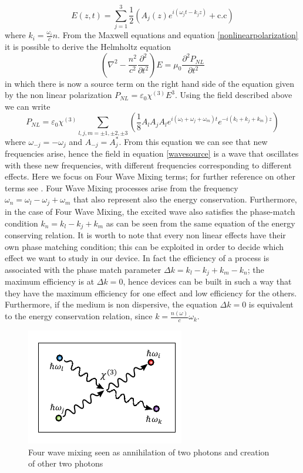\documentclass[12pt]{book}
\begin{document}
\begin{equation}E(z,t) = \sum_{j=1}^{3} \frac{1}{2}(A_j(z)e^{i(\omega_jt -k_jz)}+\text{c.c})\end{equation}
where $k_i = \frac{\omega_i}{c}n$. From the Maxwell equations and equation \eqref{nonlinearpolarization} it is possible to derive the Helmholtz equation
\begin{equation}\label{wavesource}\left(\nabla^2 - \frac{n^2}{c^2}\frac{\partial^2}{\partial t^2}\right)E = \mu_0\frac{\partial^2 P_{NL}}{\partial t^2}\end{equation}
in which there is now a source term on the right hand side of the equation given by the non linear polarization $P_{NL} = \varepsilon_0\chi^{(3)}E^3$. Using the field described above we can write
\begin{equation}P_{NL} = \varepsilon_0\chi^{(3)} \sum_{l,j,m=\pm1,\pm2,\pm3}\left(\frac{1}{8}A_lA_jA_l e^{i(\omega_l+\omega_j+\omega_m)t}e^{-i(k_l+k_j+k_m)z}\right)\end{equation}
where $\omega_{-j} = -\omega_j$ and $A_{-j} = A^*_j$. From this equation we can see that new frequencies arise, hence the field in equation \eqref{wavesource} is a wave that oscillates with these new frequencies, with different frequencies corresponding to different effects. Here we focus on Four Wave Mixing terms; for further reference on other terms see \cite{Leuthold2010}. Four Wave Mixing processes arise from the frequency $\omega_n = \omega_l - \omega_j +\omega_m$ that also represent also the energy conservation. Furthermore, in the case of Four Wave Mixing, the excited wave also satisfies the phase-match condition $k_n = k_l - k_j + k_m$ as can be seen from the same equation of the energy conserving relation. It is worth to note that every non linear effects have their own phase matching condition; this can be exploited in order to decide which effect we want to study in our device. In fact the efficiency of a process is associated with the phase match parameter \cite{phdthesis:borghi} $\Delta k = k_l - k_j + k_m -k_n$; the maximum efficiency is at $\Delta k = 0$, hence devices can be built in such a way that they have the maximum efficiency for one effect and low efficiency for the others. Furthermore, if the medium is non dispersive, the equation $\Delta k = 0$ is equivalent to the energy conservation relation, since $k = \frac{n(\omega)}{c}\omega_k$.\\
\begin{figure}
\centering
\includegraphics[width = .4\textwidth]{img/FWMphotons}
\caption{Four wave mixing seen as annihilation of two photons and creation of other two photons}
\end{figure}
\end{document}
